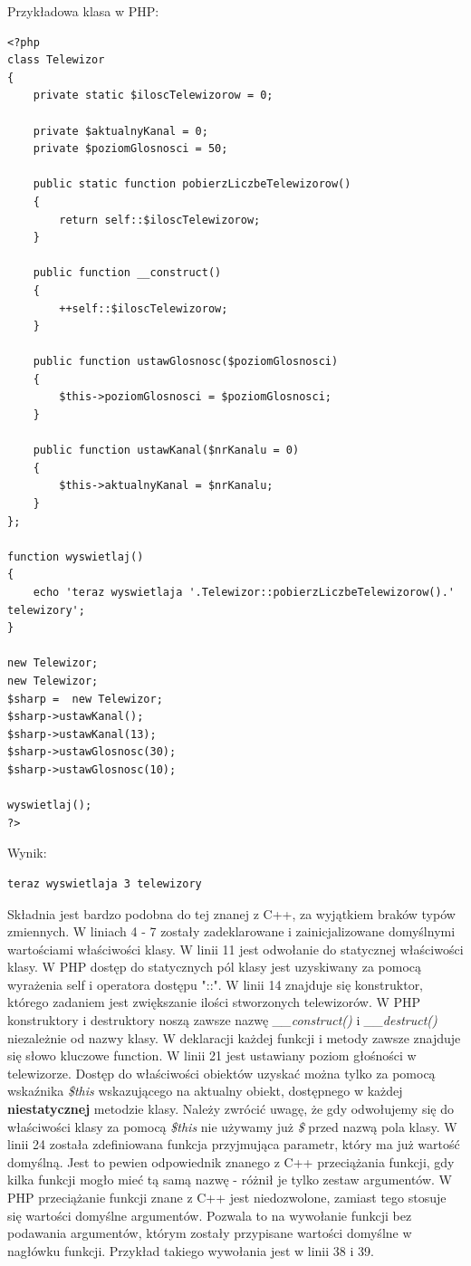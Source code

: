 \documentclass[a4paper,10pt]{article}
\begin{document}
Przykładowa klasa w PHP: \\
\begin{verbatim}
<?php
class Telewizor
{
	private static $iloscTelewizorow = 0;
	
	private $aktualnyKanal = 0;
	private $poziomGlosnosci = 50;
	
	public static function pobierzLiczbeTelewizorow()
	{
		return self::$iloscTelewizorow;
	}
	
	public function __construct()
	{
		++self::$iloscTelewizorow;
	}
	
	public function ustawGlosnosc($poziomGlosnosci)
	{
		$this->poziomGlosnosci = $poziomGlosnosci;
	}
	
	public function ustawKanal($nrKanalu = 0)
	{
		$this->aktualnyKanal = $nrKanalu;
	}
};

function wyswietlaj()
{
	echo 'teraz wyswietlaja '.Telewizor::pobierzLiczbeTelewizorow().' telewizory';
}

new Telewizor;
new Telewizor;
$sharp =  new Telewizor;
$sharp->ustawKanal();
$sharp->ustawKanal(13);
$sharp->ustawGlosnosc(30);
$sharp->ustawGlosnosc(10);

wyswietlaj();
?>
\end{verbatim}
Wynik:
\begin{verbatim}
teraz wyswietlaja 3 telewizory
\end{verbatim}
Składnia jest bardzo podobna do tej znanej z C++, za wyjątkiem braków typów zmiennych. W liniach 4 - 7 zostały zadeklarowane i zainicjalizowane domyślnymi wartościami właściwości klasy. W linii 11 jest odwołanie do statycznej właściwości klasy. W PHP dostęp do statycznych pól klasy jest uzyskiwany za pomocą wyrażenia self i operatora dostępu "::". W linii 14 znajduje się konstruktor, którego zadaniem jest zwiększanie ilości stworzonych telewizorów. W PHP konstruktory i destruktory noszą zawsze nazwę \textit{\_\_construct()} i \textit{\_\_destruct()} niezależnie od nazwy klasy. W deklaracji każdej funkcji i metody zawsze znajduje się słowo kluczowe function. W linii 21 jest ustawiany poziom głośności w telewizorze. Dostęp do właściwości obiektów uzyskać można tylko za pomocą wskaźnika \textit{\$this} wskazującego na aktualny obiekt, dostępnego w każdej \textbf{niestatycznej} metodzie klasy. Należy zwrócić uwagę, że gdy odwołujemy się do właściwości klasy za pomocą \textit{\$this} nie używamy już \textit{\$} przed nazwą pola klasy. W linii 24 została zdefiniowana funkcja przyjmująca parametr, który ma już wartość domyślną. Jest to pewien odpowiednik znanego z C++ przeciążania funkcji, gdy kilka funkcji mogło mieć tą samą nazwę - różnił je tylko zestaw argumentów. W PHP przeciążanie funkcji znane z C++ jest niedozwolone, zamiast tego stosuje się wartości domyślne argumentów. Pozwala to na wywołanie funkcji bez podawania argumentów, którym zostały przypisane wartości domyślne w nagłówku funkcji. Przykład takiego wywołania jest w linii 38 i 39.
\end{document}

